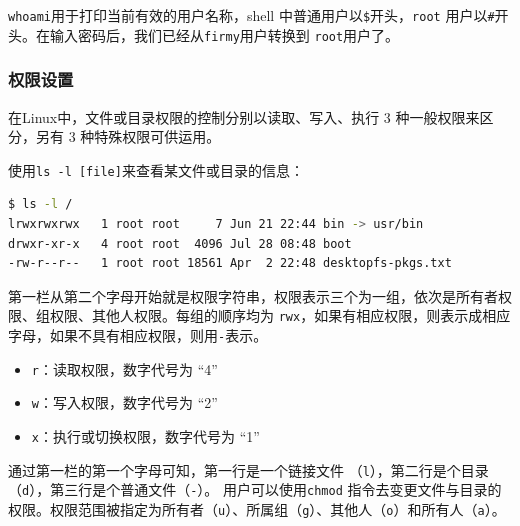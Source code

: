 \indent \verb+whoami+用于打印当前有效的用户名称，shell 中普通用户以\verb+$+开头，\verb+root+ 用户以\verb+#+开头。在输入密码后，我们已经从\verb+firmy+用户转换到 \verb+root+用户了。

\subsubsection{权限设置}
\indent \setlength{\parindent}{2em}

\intent 在Linux中，文件或目录权限的控制分别以读取、写入、执行 3 种一般权限来区分，另有 3 种特殊权限可供运用。

\indent 使用\verb+ls -l [file]+来查看某文件或目录的信息：
\begin{lstlisting}[language=bash, style=customStyleBashDark, caption=查看文件目录信息]
$ ls -l /
lrwxrwxrwx   1 root root     7 Jun 21 22:44 bin -> usr/bin
drwxr-xr-x   4 root root  4096 Jul 28 08:48 boot
-rw-r--r--   1 root root 18561 Apr  2 22:48 desktopfs-pkgs.txt
\end{lstlisting}

\indent 第一栏从第二个字母开始就是权限字符串，权限表示三个为一组，依次是所有者权限、组权限、其他人权限。每组的顺序均为 \verb+rwx+，如果有相应权限，则表示成相应字母，如果不具有相应权限，则用\verb+-+表示。

\begin{itemize}
    \item \verb+r+：读取权限，数字代号为 “4”
    \item \verb+w+：写入权限，数字代号为 “2”
    \item \verb+x+：执行或切换权限，数字代号为 “1”
\end{itemize}

\indent 通过第一栏的第一个字母可知，第一行是一个链接文件 （\verb+l+），第二行是个目录（\verb+d+），第三行是个普通文件（\verb+-+）。
\indent 用户可以使用\verb+chmod+ 指令去变更文件与目录的权限。权限范围被指定为所有者（\verb+u+）、所属组（\verb+g+）、其他人（\verb+o+）和所有人（\verb+a+）。

